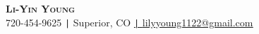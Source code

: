 \begin{center}
	\textbf{\Huge \scshape Li-Yin Young} \\ \vspace{5pt}
	\small 720-454-9625 \quad
	{\texttt{|} \quad Superior, CO} \quad
	\href{mailto:lilyyoung1122@gmail.com}{\texttt{|} \quad \underline{lilyyoung1122@gmail.com}} \quad
	
\end{center}
